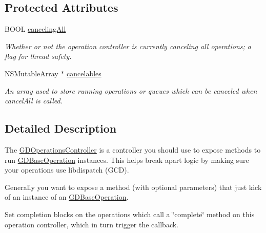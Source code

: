 \subsection*{Protected Attributes}
\begin{DoxyCompactItemize}
\item 
\hypertarget{interface_g_d_operations_controller_addf60c6ff56a45e68fbbf3cc70d83bc7}{
BOOL \hyperlink{interface_g_d_operations_controller_addf60c6ff56a45e68fbbf3cc70d83bc7}{cancelingAll}}
\label{interface_g_d_operations_controller_addf60c6ff56a45e68fbbf3cc70d83bc7}

\begin{DoxyCompactList}\small\item\em Whether or not the operation controller is currently canceling all operations; a flag for thread safety. \item\end{DoxyCompactList}\item 
\hypertarget{interface_g_d_operations_controller_adb30469e41f2c32e20b631fd8fb7a33d}{
NSMutableArray $\ast$ \hyperlink{interface_g_d_operations_controller_adb30469e41f2c32e20b631fd8fb7a33d}{cancelables}}
\label{interface_g_d_operations_controller_adb30469e41f2c32e20b631fd8fb7a33d}

\begin{DoxyCompactList}\small\item\em An array used to store running operations or queues which can be canceled when cancelAll is called. \item\end{DoxyCompactList}\end{DoxyCompactItemize}


\subsection{Detailed Description}
The \hyperlink{interface_g_d_operations_controller}{GDOperationsController} is a controller you should use to expose methods to run \hyperlink{interface_g_d_base_operation}{GDBaseOperation} instances. This helps break apart logic by making sure your operations use libdispatch (GCD).

Generally you want to expose a method (with optional parameters) that just kick of an instance of an \hyperlink{interface_g_d_base_operation}{GDBaseOperation}.

Set completion blocks on the operations which call a \char`\"{}complete\char`\"{} method on this operation controller, which in turn trigger the callback.

